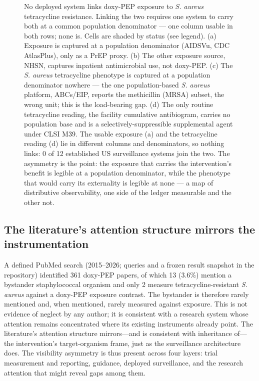 \documentclass[10pt,letterpaper]{article}
\begin{document}
\begin{figure}[!ht]
\caption{No deployed system links doxy-PEP exposure to \emph{S. aureus} tetracycline resistance.
Linking the two requires one system to carry both at a common population denominator --- one column
usable in both rows; none is. Cells are shaded by status (see legend). (a) Exposure is
captured at a population denominator (AIDSVu, CDC AtlasPlus), only as a PrEP proxy. (b) The
other exposure source, NHSN, captures inpatient antimicrobial use, not doxy-PEP. (c)
The \emph{S. aureus} tetracycline phenotype is captured at a population denominator nowhere
--- the one population-based \emph{S. aureus} platform, ABCs/EIP, reports the methicillin (MRSA)
subset, the wrong unit; this is the load-bearing gap. (d) The only routine tetracycline
reading, the facility cumulative antibiogram, carries no population base and is a
selectively-suppressible supplemental agent under CLSI M39. The usable exposure (a) and the
tetracycline reading (d) lie in different columns and denominators, so nothing links: 0 of 12
established US surveillance systems join the two. The asymmetry is the point: the exposure that carries
the intervention's benefit is legible at a population denominator, while the phenotype that would carry
its externality is legible at none --- a map of distributive observability, one side of the
ledger measurable and the other not.}
\label{fig3}
\end{figure}

\subsection*{The literature's attention structure mirrors the instrumentation}

A defined PubMed search (2015--2026; queries and a frozen result
snapshot in the repository) identified 361 doxy-PEP papers, of which 13
(3.6\%) mention a bystander staphylococcal organism and only 2 measure
tetracycline-resistant \emph{S. aureus} against a doxy-PEP exposure
contrast. The bystander is therefore rarely mentioned and, when
mentioned, rarely measured
against exposure. This is not evidence of neglect by any author; it is
consistent with a research system whose attention remains concentrated
where its existing instruments already point. The literature's attention
structure mirrors---and is consistent with inheritance of---the
intervention's target-organism frame, just as the surveillance
architecture does. The visibility asymmetry is thus present across four
layers: trial measurement and reporting, guidance, deployed surveillance,
and the research attention that might reveal gaps among them.
\end{document}
